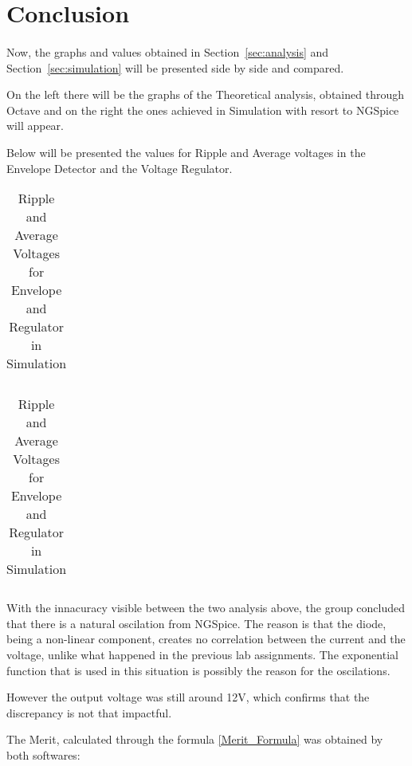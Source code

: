 \section{Conclusion}
\label{sec:conclusion}
\paragraph{}
\par Now, the graphs and values obtained in Section~\ref{sec:analysis} and Section~\ref{sec:simulation} will be presented side by side and compared.
\par On the left there will be the graphs of the Theoretical analysis, obtained through Octave and on the right the ones achieved in Simulation with resort to NGSpice will appear.
\par Below will be presented the values for Ripple and Average voltages in the Envelope Detector and the Voltage Regulator.


\begin{table}[H]
	\begin{minipage}{.5\linewidth}
		\centering
		\begin{tabular}{|c|c|}
		\hline
		
		\end{tabular}
		\caption{Ripple and Average Voltages for Envelope and Regulator in Theoretical Analysis}
		\label{table1a}
	\end{minipage}
	\begin{minipage}{.5\linewidth}
		\centering
		\begin{tabular}{|c|c|}
		\hline
		
	\end{tabular}
 		\caption{Ripple and Average Voltages for Envelope and Regulator in Simulation}
		\label{table1b}
	\end{minipage} 
\end{table}

\par With the innacuracy visible between the two analysis above, the group concluded that there is a natural oscilation from NGSpice. The reason is that the diode, being a non-linear component, creates no correlation between
the current and the voltage, unlike what happened in the previous lab assignments. The exponential function that is used in this situation is possibly the reason for the oscilations.
\par However the output voltage was still around 12V, which confirms that the discrepancy is not that impactful.
\par The Merit, calculated through the formula \ref{Merit_Formula} was obtained by both softwares:

